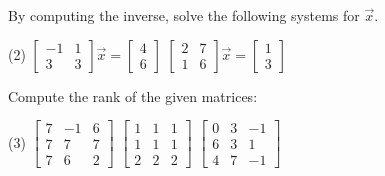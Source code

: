 \begin{exercise}
By computing the inverse,
solve the following systems for $\vec{x}$.
\begin{tasks}(2)
\task
$\begin{bmatrix}
-1 & 1 \\
3 & 3
\end{bmatrix} \vec{x} =
\begin{bmatrix} 4 \\ 6 \end{bmatrix}$
\task
$\begin{bmatrix}
2 & 7 \\
1 & 6
\end{bmatrix} \vec{x} =
\begin{bmatrix} 1 \\ 3 \end{bmatrix}$
\end{tasks}
\end{exercise}

\begin{exercise} \label{exercise:rankmatrixans}
Compute the rank of the given matrices:
\begin{tasks}(3)
\task
$\begin{bmatrix}
7 & -1 & 6 \\
7 & 7 & 7 \\
7 & 6 & 2
\end{bmatrix}$
\task
$\begin{bmatrix}
1 & 1 & 1 \\
1 & 1 & 1 \\
2 & 2 & 2
\end{bmatrix}$
\task
$\begin{bmatrix}
0 & 3 & -1 \\
6 & 3 & 1 \\
4 & 7 & -1
\end{bmatrix}$
\end{tasks}
\end{exercise}

